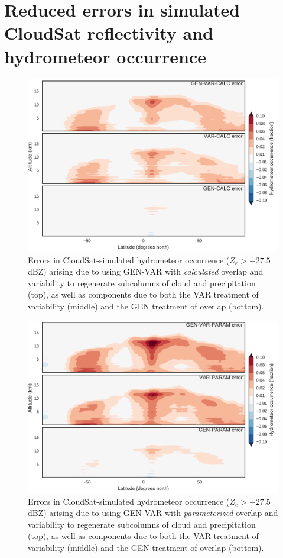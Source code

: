 \section{Reduced errors in simulated CloudSat reflectivity and hydrometeor occurrence}
\label{subgrid2_active_section}

\begin{figure}
\centering
\includegraphics[width=\columnwidth]{graphics/subgrid2_hfba_zonal_gen-var-calc_diff.pdf}
\caption{Errors in CloudSat-simulated hydrometeor occurrence ($Z_e > -27.5$ dBZ) arising due to using GEN-VAR with \emph{calculated} overlap and variability to regenerate subcolumns of cloud and precipitation (top), as well as components due to both the VAR treatment of variability (middle) and the GEN treatment of overlap (bottom).}
\label{subgrid2_hfba_zonal_diff}
\end{figure}

\begin{figure}
\centering
\includegraphics[width=\columnwidth]{graphics/subgrid2_hfba_zonal_gen-var-param_diff.pdf}
\caption{Errors in CloudSat-simulated hydrometeor occurrence ($Z_e > -27.5$ dBZ) arising due to using GEN-VAR with \emph{parameterized} overlap and variability to regenerate subcolumns of cloud and precipitation (top), as well as components due to both the VAR treatment of variability (middle) and the GEN treatment of overlap (bottom).}
\label{subgrid2_hfba_zonal_gen-var-param_diff}
\end{figure}

